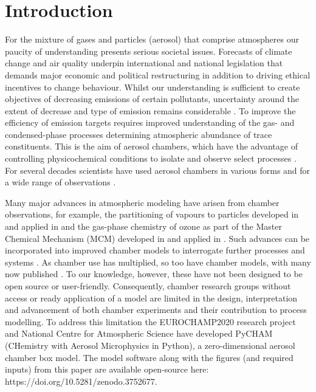 \documentclass[gmd, manuscript]{copernicus}
\begin{document}

\section{Introduction}\label{sec:intro}

For the mixture of gases and particles (aerosol) that comprise atmospheres our paucity of understanding presents serious societal issues.  Forecasts of climate change and air quality underpin international and national legislation \citep[e.g.][]{UNFCCC2018, UKEnvironmentBill2020, EUAQ2020} that demands major economic and political restructuring \citep{MIT2020} in addition to driving ethical incentives to change behaviour.  Whilst our understanding is sufficient to create objectives of decreasing emissions of certain pollutants, uncertainty around the extent of decrease and type of emission remains considerable \citep{Heal2012, Johnson2018, Tong2019}.  To improve the efficiency of emission targets requires improved understanding of the gas- and condensed-phase processes determining atmospheric abundance of trace constituents.  This is the aim of aerosol chambers, which have the advantage of controlling physicochemical conditions to isolate and observe select processes \citep{Schwantes2017, Charan2019}.  For several decades scientists have used aerosol chambers in various forms and for a wide range of observations \citep[e.g.][]{Griffin1956}.

Many major advances in atmospheric modeling have arisen from chamber observations, for example, the partitioning of vapours to particles developed in \citet{Odum1996} and applied in \citet[e.g.][]{Meng1997} and the gas-phase chemistry of ozone as part of the Master Chemical Mechanism (MCM) developed in \citet{Jenkin1997} and applied in \citet[e.g.][]{Ying2011}.  Such advances can be incorporated into improved chamber models \citep[e.g.][]{Charan2019} to interrogate further processes and systems \citep[e.g.][]{Riva2020}.  As chamber use has multiplied, so too have chamber models, with many now published \citep{Naumann2003, Pierce2008, Lowe2009, Roldin2014, Sunol2018, Topping2018, Charan2019, Roldin2019}.  To our knowledge, however, these have not been designed to be open source or user-friendly.  Consequently, chamber research groups without access or ready application of a model are limited in the design, interpretation and advancement of both chamber experiments and their contribution to process modelling.  To address this limitation the EUROCHAMP2020 \citep{EUROCHAMP2020} research project and National Centre for Atmospheric Science have developed PyCHAM (CHemistry with Aerosol Microphysics in Python), a zero-dimensional aerosol chamber box model.  The model software along with the figures (and required inputs) from this paper are available open-source here: https://doi.org/10.5281/zenodo.3752677.
\end{document}
